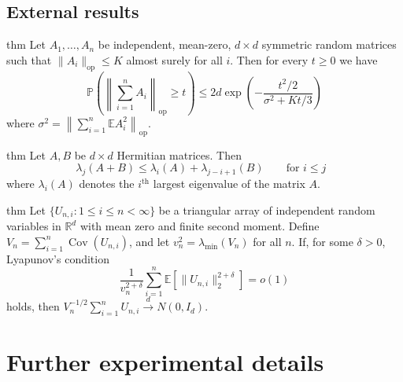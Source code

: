 \documentclass[11pt]{article}
\begin{document}
\begin{appendices}
\subsection{External results}

\begin{restatable}{thm}{}
    Let $A_1, \dots, A_n$ be independent, mean-zero, $d\times d$ symmetric random matrices such that $\|A_i\|_{\operatorname{op}} \leq K$ almost surely for all $i$. Then for every $t \geq 0$ we have
    \[\mathbb{P}\left(\left\|\sum_{i = 1}^nA_i\right\|_{\operatorname{op}} \geq t\right) \leq 2d\exp\left(-\frac{t^2/2}{\sigma^2 + Kt/3}\right)\]
    where $\sigma^2 = \left\|\sum_{i = 1}^n\mathbb{E}A_i^2\right\|_{\operatorname{op}}$. \label{thm: matrix bernstein}
\end{restatable}

\begin{restatable}{thm}{}  \label{thm: weyl}
    Let $A, B$ be $d\times d$ Hermitian matrices. Then
    \[\lambda_j(A+B) \leq \lambda_i(A) + \lambda_{j - i+1}(B) \qquad \text{for $i\leq j$ }\]
    where $\lambda_i(A)$ denotes the $i^{\text{th}}$ largest eigenvalue of the matrix $A$. 
\end{restatable}

\begin{restatable}{thm}{} \label{thm: lyapunov clt}
    Let $\{U_{n, i}: 1 \leq i \leq n < \infty\}$ be a triangular array of independent random variables in $\mathbb{R}^d$ with mean zero and finite second moment. Define $V_n = \sum_{i= 1}^n \operatorname{Cov}(U_{n,i})$, and let $v_n^2 = \lambda_{\min}(V_n)$ for all $n$. If, for some $\delta > 0$, Lyapunov's condition
    \[\frac{1}{v_n^{2+\delta}}\sum_{i = 1}^n \mathbb{E}\left[\|U_{n, i}\|_2^{2+\delta}\right] = o(1)\]
    holds, then $V_n^{-1/2}\sum_{i = 1}^nU_{n, i} \overset{d}{\rightarrow} N(0, I_d)$.
\end{restatable}

\section{Further experimental details}\label{experimental details}


\end{appendices}
\end{document}
